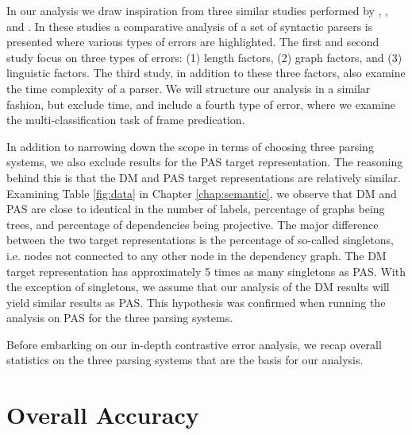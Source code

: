 
In our analysis we draw inspiration from three similar studies performed by , , and . In these studies a comparative analysis of a set of syntactic parsers is presented where various types of errors are highlighted. The first and second study focus on three types of errors: (1) length factors, (2) graph factors, and (3) linguistic factors. The third study, in addition to these three factors, also examine the time complexity of a parser. We will structure our analysis in a similar fashion, but exclude time, and include a fourth type of error, where we examine the multi-classification task of frame predication.

In addition to narrowing down the scope in terms of choosing three parsing systems, we also exclude results for the PAS target representation. The reasoning behind this is that the DM and PAS target representations are relatively similar. Examining Table \ref{fig:data} in Chapter \ref{chap:semantic}, we observe that DM and PAS are close to identical in the number of labels, percentage of graphs being trees, and percentage of dependencies being projective. The major difference between the two target representations is the percentage of so-called singletons, i.e. nodes not connected to any other node in the dependency graph. The DM target representation has approximately 5 times as many singletons as PAS. With the exception of singletons, we assume that our analysis of the DM results will yield similar results as PAS. This hypothesis was confirmed when running the analysis on PAS for the three parsing systems.

Before embarking on our in-depth contrastive error analysis, we recap overall statistics on the three parsing systems that are the basis for our analysis.

\section{Overall Accuracy}

